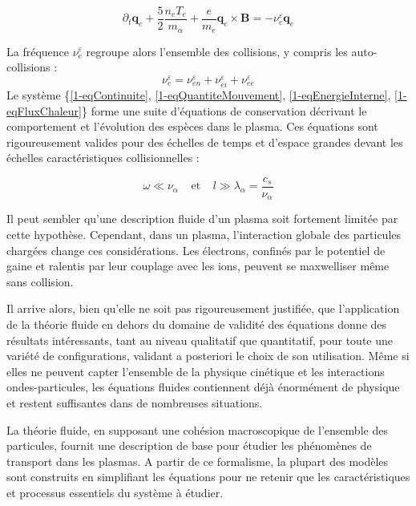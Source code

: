 \begin{refsection}
\begin{equation}
\label{1-eqFluxChaleur2}
\partial_t\mathbf
q_e+\frac{5}{2}\frac{n_e
T_e}{m_\alpha}+\frac{e}{m_e} \mathbf q_e\times\mathbf
B=-\nu_{e}^\varepsilon\mathbf q_e
\end{equation}

La fréquence $\nu_e^\varepsilon$ regroupe alors l'ensemble des collisions, y
compris les auto-collisions :
\begin{equation}
\nu_e^\varepsilon=\nu_{en}^\varepsilon+\nu_{ei}^\varepsilon+\nu_{ee}^\varepsilon
\end{equation} 
Le système \{\textup{\ref{1-eqContinuite},
\ref{1-eqQuantiteMouvement}, \ref{1-eqEnergieInterne},
\ref{1-eqFluxChaleur}}\} forme une suite d'équations de conservation décrivant
le comportement et l'évolution des espèces dans le plasma.
Ces équations sont rigoureusement valides pour des échelles de temps et d'espace
grandes devant les échelles caractéristiques collisionnelles :

\begin{equation}
\omega\ll \nu_{\alpha}
\;\;\;\;\text{et}\;\;\;\;l\gg\lambda_\alpha=\frac{c_s}{\nu_\alpha}
\end{equation}

Il peut sembler qu'une description fluide d'un plasma soit fortement limitée par
cette hypothèse. Cependant, dans un plasma, l'interaction globale des
particules chargées change ces considérations.
Les électrons, confinés par le potentiel de gaine et ralentis par leur
couplage avec les ions, peuvent se maxwelliser même sans collision. 

Il arrive alors, bien qu'elle ne soit pas rigoureusement justifiée,
que l'application de la théorie fluide en
dehors du domaine de validité des équations donne des résultats intéressants,
tant au niveau qualitatif que quantitatif,
pour toute une variété de configurations, validant a posteriori le choix de son
utilisation.
Même si elles ne peuvent capter l'ensemble de la
physique cinétique et les interactions ondes-particules, les équations fluides
contiennent déjà énormément de physique et restent suffisantes dans de
nombreuses situations.

La théorie fluide, en supposant une cohésion macroscopique de l'ensemble des
particules, fournit une description de base pour étudier les phénomènes de
transport dans les plasmas. A partir de ce formalisme, la plupart des modèles
sont construits en simplifiant les équations pour ne retenir que
les caractéristiques et processus essentiels du système à étudier. 

\end{refsection}


